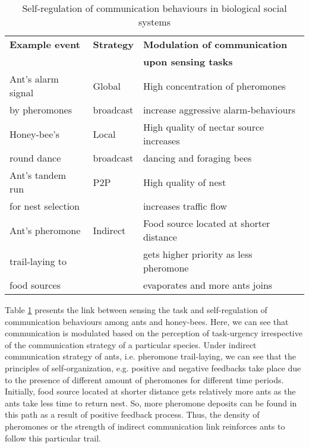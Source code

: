 \begin{table}
\caption{Self-regulation of communication behaviours in biological social systems}
\label{table:bio-comm-task-urgency}
\begin{center}
\begin{tabular}{|l|l|l|}
\hline \textbf{Example event} & \textbf{Strategy} & \textbf{Modulation of communication}\\
&  &  \textbf{upon sensing tasks}\\
\hline Ant's alarm signal &  Global  & High concentration of pheromones\\
by pheromones & broadcast &  increase aggressive alarm-behaviours \\                                                                                                                                               
\hline Honey-bee's  & Local  &  High quality of nectar source increases \\
round dance & broadcast & dancing and foraging bees\\
\hline Ant's tandem run     & P2P & High quality of nest \\
for nest selection & &   increases traffic flow\\
\hline Ant's pheromone   & Indirect & Food source located at shorter distance\\
trail-laying to   & &  gets higher priority as less pheromone \\
food sources & & evaporates and more ants joins\\
\hline
\end{tabular}
\end{center}
\end{table}
Table \ref{table:bio-comm-task-urgency} presents the link between sensing the task and self-regulation of communication behaviours among ants and honey-bees. Here, we can see that communication is modulated based on the perception of  task-urgency irrespective of the communication strategy of a particular species. Under indirect communication strategy of ants, i.e. pheromone trail-laying, we can see that the principles of self-organization, e.g. positive and negative feedbacks take place due to the presence of different amount of pheromones for different time periods. Initially, food source located at shorter distance gets relatively more ants  as the ants take less time to return nest. So, more pheromone deposits can be found in this path as a result of positive feedback process.  Thus, the density of pheromones or the strength of indirect communication link reinforces ants to follow this particular trail.

